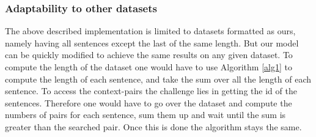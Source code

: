 \subsubsection{Adaptability to other datasets}
The above described implementation is limited to datasets formatted as ours, namely having all sentences except the last of the same length. But our model can be quickly modified to achieve the same results on any given dataset. To compute the length of the dataset one would have to use Algorithm \ref{alg1} to compute the length of each sentence, and take the sum over all the length of each sentence. To access the context-pairs the challenge lies in getting the id of the sentences. Therefore one would have to go over the dataset and compute the numbers of pairs for each sentence, sum them up and wait until the sum is greater than the searched pair. Once this is done the algorithm stays the same. 

